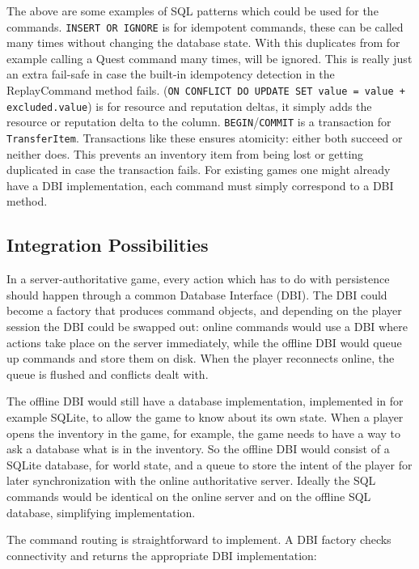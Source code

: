 \documentclass{article}
\begin{document}
The above are some examples of SQL patterns which could be used for the commands. \texttt{INSERT OR IGNORE} is for idempotent commands, these can be called many times without changing the database state. With this duplicates from for example calling a Quest command many times, will be ignored. This is really just an extra fail-safe in case the built-in idempotency detection in the ReplayCommand method fails. (\texttt{ON CONFLICT DO UPDATE SET value = value + excluded.value}) is for resource and reputation deltas, it simply adds the resource or reputation delta to the column. \texttt{BEGIN}/\texttt{COMMIT} is a transaction for \texttt{TransferItem}. Transactions like these ensures atomicity: either both succeed or neither does. This prevents an inventory item from being lost or getting duplicated in case the transaction fails. For existing games one might already have a DBI implementation, each command must simply correspond to a DBI method.

\subsection{Integration Possibilities}

In a server-authoritative game, every action which has to do with persistence should happen through a common Database Interface (DBI). The DBI could become a factory that produces command objects, and depending on the player session the DBI could be swapped out: online commands would use a DBI where actions take place on the server immediately, while the offline DBI would queue up commands and store them on disk. When the player reconnects online, the queue is flushed and conflicts dealt with.

The offline DBI would still have a database implementation, implemented in for example SQLite, to allow the game to know about its own state. When a player opens the inventory in the game, for example, the game needs to have a way to ask a database what is in the inventory. So the offline DBI would consist of a SQLite database, for world state, and a queue to store the intent of the player for later synchronization with the online authoritative server. Ideally the SQL commands would be identical on the online server and on the offline SQL database, simplifying implementation. 

\newpage

The command routing is straightforward to implement. A DBI factory checks connectivity and returns the appropriate DBI implementation:
\end{document}
